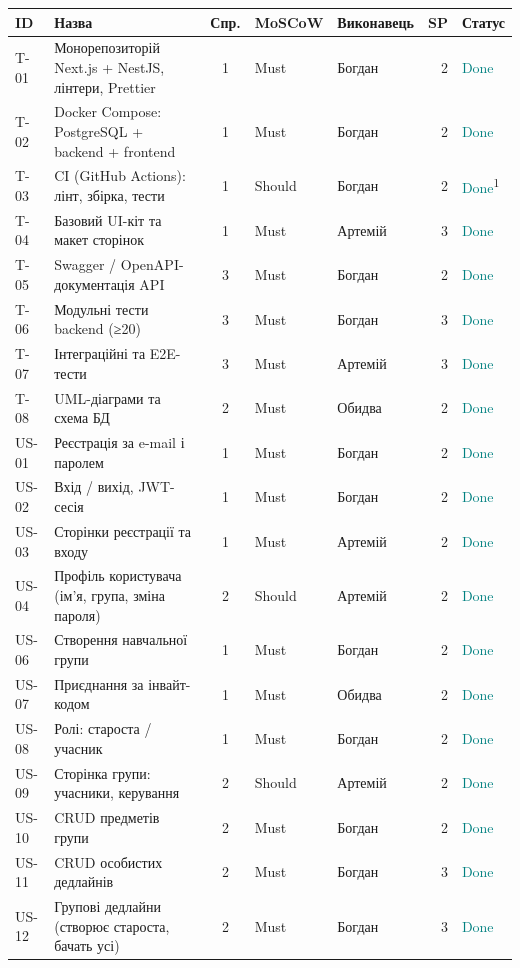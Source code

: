 \begin{longtable}{@{}l L{5.0cm} c l l r l@{}}
\toprule
ID & Назва & Спр. & MoSCoW & Виконавець & SP & Статус\\
\midrule\endhead
T-01 & Монорепозиторій Next.js + NestJS, лінтери, Prettier & 1 & Must & Богдан & 2 & \textcolor{teal}{Done}\\
T-02 & Docker Compose: PostgreSQL + backend + frontend & 1 & Must & Богдан & 2 & \textcolor{teal}{Done}\\
T-03 & CI (GitHub Actions): лінт, збірка, тести & 1 & Should & Богдан & 2 & \textcolor{teal}{Done}\textsuperscript{1}\\
T-04 & Базовий UI-кіт та макет сторінок & 1 & Must & Артемій & 3 & \textcolor{teal}{Done}\\
T-05 & Swagger / OpenAPI-документація API & 3 & Must & Богдан & 2 & \textcolor{teal}{Done}\\
T-06 & Модульні тести backend (≥20) & 3 & Must & Богдан & 3 & \textcolor{teal}{Done}\\
T-07 & Інтеграційні та E2E-тести & 3 & Must & Артемій & 3 & \textcolor{teal}{Done}\\
T-08 & UML-діаграми та схема БД & 2 & Must & Обидва & 2 & \textcolor{teal}{Done}\\
US-01 & Реєстрація за e-mail і паролем & 1 & Must & Богдан & 2 & \textcolor{teal}{Done}\\
US-02 & Вхід / вихід, JWT-сесія & 1 & Must & Богдан & 2 & \textcolor{teal}{Done}\\
US-03 & Сторінки реєстрації та входу & 1 & Must & Артемій & 2 & \textcolor{teal}{Done}\\
US-04 & Профіль користувача (ім'я, група, зміна пароля) & 2 & Should & Артемій & 2 & \textcolor{teal}{Done}\\
US-06 & Створення навчальної групи & 1 & Must & Богдан & 2 & \textcolor{teal}{Done}\\
US-07 & Приєднання за інвайт-кодом & 1 & Must & Обидва & 2 & \textcolor{teal}{Done}\\
US-08 & Ролі: староста / учасник & 1 & Must & Богдан & 2 & \textcolor{teal}{Done}\\
US-09 & Сторінка групи: учасники, керування & 2 & Should & Артемій & 2 & \textcolor{teal}{Done}\\
US-10 & CRUD предметів групи & 2 & Must & Богдан & 2 & \textcolor{teal}{Done}\\
US-11 & CRUD особистих дедлайнів & 2 & Must & Богдан & 3 & \textcolor{teal}{Done}\\
US-12 & Групові дедлайни (створює староста, бачать усі) & 2 & Must & Богдан & 3 & \textcolor{teal}{Done}\\

\end{longtable}
